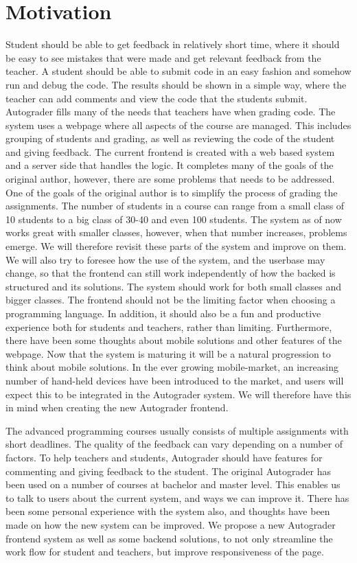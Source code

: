 \chapter*{Motivation}

 Student should be able to get feedback in relatively short time, where it should be easy to see mistakes that were made and get relevant feedback from the teacher. A student should be able to submit code in an easy fashion and somehow run and debug the code. The results should be shown in a simple way, where the teacher can add comments and view the code that the students submit. Autograder fills many of the needs that teachers have when grading code. The system uses a webpage where all aspects of the course are managed. This includes grouping of students and grading, as well as reviewing the code of the student and giving feedback. The current frontend is created with a web based system and a server side that handles the logic. It completes many of the goals of the original author, however, there are some problems that needs to be addressed. One of the goals of the original author is to simplify the process of grading the assignments. The number of students in a course can range from a small class of 10 students to a big class of 30-40 and even 100 students. The system as of now works great with smaller classes, however, when that number increases, problems emerge. We will therefore revisit these parts of the system and improve on them. We will also try to foresee how the use of the system, and the userbase may change, so that the frontend can still work independently of how the backed is structured and its solutions. The system should work for both small classes and bigger classes. The frontend should not be the limiting factor when choosing a programming language. In addition, it should also be a fun and productive experience both for students and teachers, rather than limiting. Furthermore, there have been some thoughts about mobile solutions and other features of the webpage. Now that the system is maturing it will be a natural progression to think about mobile solutions. In the ever growing mobile-market, an increasing number of hand-held devices have been introduced to the market, and users will expect this to be integrated in the Autograder system. We will therefore have this in mind when creating the new Autograder frontend.

The advanced programming courses usually consists of multiple assignments with short deadlines. The quality of the feedback can vary depending on a number of factors. To help teachers and students, Autograder should have features for commenting and giving feedback to the student. The original Autograder has been used on a number of courses at bachelor and master level. This enables us to talk to users about the current system, and ways we can improve it. There has been some personal experience with the system also, and thoughts have been made on how the new system can be improved. We propose a new Autograder frontend system as well as some backend solutions, to not only streamline the work flow for student and teachers, but improve responsiveness of the page.
